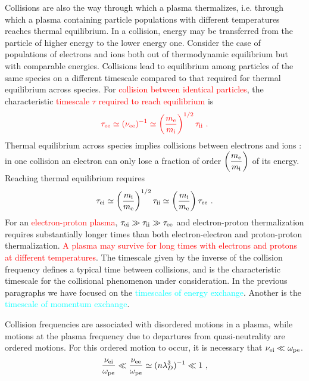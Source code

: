 \documentclass[12pt,a4paper]{article}
\begin{document}
Collisions are also the way through which a plasma thermalizes, i.e. through which a plasma containing particle populations with different temperatures reaches thermal equilibrium. In a collision, energy may be transferred from the particle of higher energy to the lower energy one. Consider the case of populations of electrons and ions both out of thermodynamic equilibrium but with comparable energies. Collisions lead to equilibrium among particles of the same species on a different timescale compared to that required for thermal equilibrium across species. For \textcolor{red}{collision between identical particles}, the characteristic \textcolor{red}{timescale $\tau$ required to reach equilibrium} is
\begin{equation*}
\color{red} \tau_{\rm ee} \simeq (\nu_{\rm ee})^{-1} \simeq \left(\frac{m_{\rm e}}{m_{\rm i}} \right)^{1/2} \tau_{\rm ii} ~.
\end{equation*}
Thermal equilibrium across species implies collisions between electrons and ions : in one collision an electron can only lose a fraction of order $\left(\dfrac{m_{\rm e}}{m_{\rm i}} \right)$ of its energy. Reaching thermal equilibrium requires
\begin{equation*}
\tau_{\rm ei} \simeq \left(\frac{m_{\rm i}}{m_{\rm e}} \right)^{1/2} \tau_{\rm ii} \simeq \left(\frac{m_{\rm i}}{m_{\rm e}} \right) \tau_{\rm ee} ~.
\end{equation*}
For an \textcolor{red}{electron-proton plasma},  \textcolor{red}{$\tau_{\rm ei} \gg \tau_{\rm ii} \gg \tau_{\rm ee}$} and electron-proton thermalization requires substantially longer times than both electron-electron and proton-proton thermalization. \textcolor{red}{A plasma may survive for long times with electrons and protons at different temperatures}. The timescale given by the inverse of the collision frequency defines a typical time between collisions, and is the characteristic timescale for the collisional phenomenon under consideration. In the previous paragraphs we have focused on the \textcolor{cyan}{timescales of energy exchange}. Another is the \textcolor{cyan}{timescale of momentum exchange}. 

Collision frequencies are associated with disordered motions in a plasma, while motions at the plasma frequency due to departures from quasi-neutrality are ordered motions. For this ordered motion to occur, it is necessary that $\nu_{\rm ei} \ll \omega_{\rm pe}$. 
\begin{equation*}
\frac{\nu_{\rm ei} }{\omega_{\rm pe}} \ll \frac{\nu_{\rm ee} }{\omega_{\rm pe}} \simeq (n \lambda^3_D)^{-1} \ll 1 ~,
\end{equation*}
\end{document}

